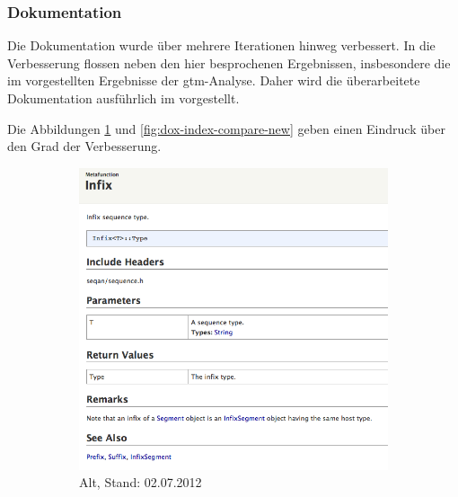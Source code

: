 \subsubsection{Dokumentation}

Die Dokumentation wurde über mehrere Iterationen hinweg verbessert. In die Verbesserung flossen neben den hier besprochenen Ergebnissen, insbesondere die im  vorgestellten Ergebnisse der \gls{gtm}-Analyse. Daher wird die überarbeitete Dokumentation ausführlich im  vorgestellt.

Die Abbildungen \ref{fig:dox-index-compare-old} und \ref{fig:dox-index-compare-new} geben einen Eindruck über den Grad der Verbesserung.

\begin{figure}
        \centering
        \begin{subfigure}{0.48\linewidth}
                \includegraphics[width=\linewidth]{Figures/dox/infix-old.png}
                  \caption[Vergleich Dokumentationseintrag \texttt{Infix} - Alt]{Alt, Stand: 02.07.2012}
                \label{fig:dox-index-compare-old}
        \end{subfigure}%
        \hfill%
        \begin{subfigure}{0.48\linewidth}%

\end{subfigure}
\end{figure}
